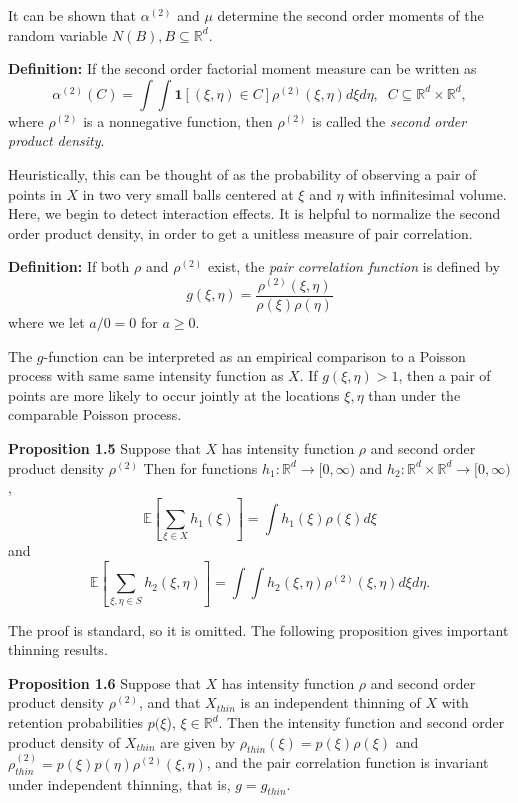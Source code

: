 \documentclass[12pt,twoside]{reedthesis}
\begin{document}
  It can be shown that \(\alpha^{(2)}\) and \(\mu\) determine the second
  order moments of the random variable \(N(B), B\subseteq \mathbb{R}^d\).
  
  \textbf{Definition:} If the second order factorial moment measure can be
  written as
  \[\alpha^{(2)}(C) = \int \int \mathbf{1}[(\xi, \eta) \in C] \rho^{(2)} (\xi, \eta) d\xi d\eta, \; \; C\subseteq \mathbb{R}^d \times \mathbb{R}^d , \]
  where \(\rho^{(2)}\) is a nonnegative function, then \(\rho^{(2)}\) is
  called the \emph{second order product density}.
  
  Heuristically, this can be thought of as the probability of observing a
  pair of points in \(X\) in two very small balls centered at \(\xi\) and
  \(\eta\) with infinitesimal volume. Here, we begin to detect interaction
  effects. It is helpful to normalize the second order product density, in
  order to get a unitless measure of pair correlation.
  
  \textbf{Definition:} If both \(\rho\) and \(\rho^{(2)}\) exist, the
  \emph{pair correlation function} is defined by
  \[ g(\xi, \eta) = \frac{ \rho^{(2)}(\xi, \eta)}{\rho(\xi)\rho(\eta)} \]
  where we let \(a/0 = 0\) for \(a\geq 0\).
  
  The \(g\)-function can be interpreted as an empirical comparison to a
  Poisson process with same same intensity function as \(X\). If
  \(g(\xi, \eta) >1\), then a pair of points are more likely to occur
  jointly at the locations \(\xi, \eta\) than under the comparable Poisson
  process.
  
  \textbf{Proposition 1.5} Suppose that \(X\) has intensity function
  \(\rho\) and second order product density \(\rho^{(2)}\) Then for
  functions \(h_1: \mathbb{R}^d \rightarrow [0, \infty)\) and
  \(h_2: \mathbb{R}^d \times \mathbb{R}^d \rightarrow [0, \infty)\),
  \[ \mathbb{E} [\sum_{\xi \in X} h_1(\xi)] = \int h_1(\xi) \rho(\xi) d\xi\]
  and
  \[ \mathbb{E} [\sum_{\xi, \eta \in S} h_2(\xi, \eta)] = \int \int h_2(\xi, \eta) \rho^{(2)}(\xi, \eta) d\xi d\eta.\]
  
  The proof is standard, so it is omitted. The following proposition gives
  important thinning results.
  
  \textbf{Proposition 1.6} Suppose that \(X\) has intensity function
  \(\rho\) and second order product density \(\rho^{(2)}\), and that
  \(X_{thin}\) is an independent thinning of \(X\) with retention
  probabilities \(p(\xi\)), \(\xi \in \mathbb{R}^d\). Then the intensity
  function and second order product density of \(X_{thin}\) are given by
  \(\rho_{thin}(\xi) = p(\xi)\rho(\xi)\) and
  \(\rho_{thin}^{(2)} = p(\xi)p(\eta)\rho^{(2)}(\xi, \eta)\), and the pair
  correlation function is invariant under independent thinning, that is,
  \(g = g_{thin}\).
  
\end{document}
